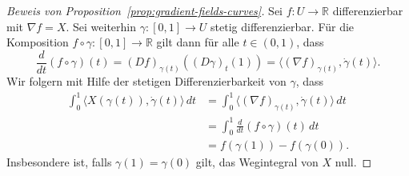 \documentclass[../main.tex]{subfiles}
\begin{document}
\begin{proof}[Beweis von Proposition~\ref{prop:gradient-fields-curves}]
  Sei $f \colon U \to \mathbb{R}$ differenzierbar
  mit $\nabla f = X$.
  Sei weiterhin $\gamma \colon [0, 1] \to U$ stetig differenzierbar.
  Für die Komposition $f \circ \gamma \colon [0, 1] \to \mathbb{R}$
  gilt dann für alle $t \in (0, 1)$, dass
  \[
    \frac{d}{dt}(f \circ \gamma) (t)
    = {(Df)}_{\gamma(t)}({(D\gamma)}_t(1))
    = \langle {(\nabla f)}_{\gamma(t)}, \dot \gamma(t) \rangle.
  \]
  Wir folgern mit Hilfe der stetigen Differenzierbarkeit
  von $\gamma$, dass
  \begin{align*}
    \int_{0}^{1} \langle X(\gamma(t)), \dot \gamma(t) \rangle \, dt
    &= \int_{0}^{1} \langle {(\nabla f)}_{\gamma(t)},
    \dot \gamma(t) \rangle \, dt \\
    &= \int_{0}^{1} \frac{d}{dt} (f \circ \gamma)(t) \, dt  \\
    &= f(\gamma(1)) - f(\gamma(0)).
  \end{align*}
  Insbesondere ist, falls $\gamma(1) = \gamma(0)$ gilt, das Wegintegral
  von $X$ null.


\end{proof}
\end{document}

